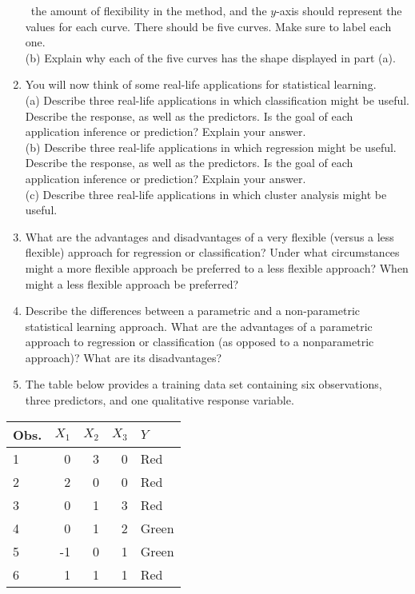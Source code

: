 \documentclass[10pt]{article}
\begin{document}
\begin{enumerate}
\
the amount of flexibility in the method, and the $y$-axis should represent the values for each curve. There should be five curves. Make sure to label each one.\\
(b) Explain why each of the five curves has the shape displayed in part (a).
  \item You will now think of some real-life applications for statistical learning.\\
(a) Describe three real-life applications in which classification might be useful. Describe the response, as well as the predictors. Is the goal of each application inference or prediction? Explain your answer.\\
(b) Describe three real-life applications in which regression might be useful. Describe the response, as well as the predictors. Is the goal of each application inference or prediction? Explain your answer.\\
(c) Describe three real-life applications in which cluster analysis might be useful.
  \item What are the advantages and disadvantages of a very flexible (versus a less flexible) approach for regression or classification? Under what circumstances might a more flexible approach be preferred to a less flexible approach? When might a less flexible approach be preferred?
  \item Describe the differences between a parametric and a non-parametric statistical learning approach. What are the advantages of a parametric approach to regression or classification (as opposed to a nonparametric approach)? What are its disadvantages?
  \item The table below provides a training data set containing six observations, three predictors, and one qualitative response variable.
\end{enumerate}

\begin{center}
\begin{tabular}{l|rrrl}
\hline
Obs. & $X_{1}$ & $X_{2}$ & $X_{3}$ & $Y$ \\
\hline
1 & 0 & 3 & 0 & Red \\
2 & 2 & 0 & 0 & Red \\
3 & 0 & 1 & 3 & Red \\
4 & 0 & 1 & 2 & Green \\
5 & -1 & 0 & 1 & Green \\
6 & 1 & 1 & 1 & Red \\
\hline
\end{tabular}
\end{center}
\end{document}
